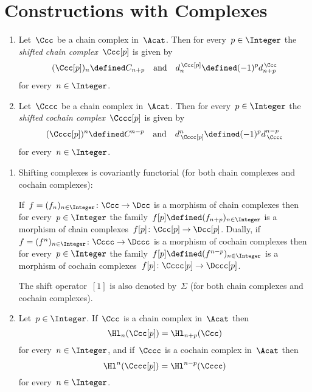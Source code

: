 \section{Constructions with Complexes}


\begin{definition}
  \leavevmode
  \begin{enumerate}
    \item
      Let~$\Ccc$ be a chain complex in~$\Acat$.
      Then for every~$p \in \Integer$ the \emph{shifted chain complex}~$\Ccc[p]$ is given by
      \[
                  (\Ccc[p])_n
        \defined  C_{n+p}
        \quad\text{and}\quad
                  d^{\,\Ccc[p]}_n
        \defined  (-1)^p d^{\,\Ccc}_{n+p}
      \]
      for every~$n \in \Integer$.
    \item
      Let~$\Cccc$ be a chain complex in~$\Acat$.
      Then for every~$p \in \Integer$ the \emph{shifted cochain complex}~$\Cccc[p]$ is given by
      \[
                  (\Cccc[p])^n
        \defined  C^{n-p}
        \quad\text{and}\quad
                  d_{\,\Cccc[p]}^n
        \defined  (-1)^p d_{\,\Cccc}^{n-p}
      \]
      for every~$n \in \Integer$.
  \end{enumerate}
\end{definition}


\begin{remark}
  \leavevmode
  \begin{enumerate}
    \item
      Shifting complexes is covariantly functorial (for both chain complexes and cochain complexes):
      
      If~$f = (f_n)_{n \in \Integer} \colon \Ccc \to \Dcc$ is a morphism of chain complexes then for every~$p \in \Integer$ the family~$f[p] \defined (f_{n+p})_{n \in \Integer}$ is a morphism of chain complexes~$f[p] \colon \Ccc[p] \to \Dcc[p]$.
      Dually, if~$f = (f^n)_{n \in \Integer} \colon \Cccc \to \Dccc$ is a morphism of cochain complexes then for every~$p \in \Integer$ the family~$f[p] \defined (f^{n-p})_{n \in \Integer}$ is a morphism of cochain complexes~$f[p] \colon \Cccc[p] \to \Dccc[p]$.
      
      The shift operator~$[1]$ is also denoted by~$\Sigma$ (for both chain complexes and cochain complexes).
    \item
      Let~$p \in \Integer$.
      If~$\Ccc$ is a chain complex in~$\Acat$ then
      \[
          \Hl_n(\Ccc[p])
        = \Hl_{n+p}(\Ccc)
      \]
      for every~$n \in \Integer$, and if~$\Cccc$ is a cochain complex in~$\Acat$ then
      \[
          \Hl^n(\Cccc[p])
        = \Hl^{n-p}(\Cccc)
      \]
      for every~$n \in \Integer$.
  \end{enumerate}
\end{remark}


